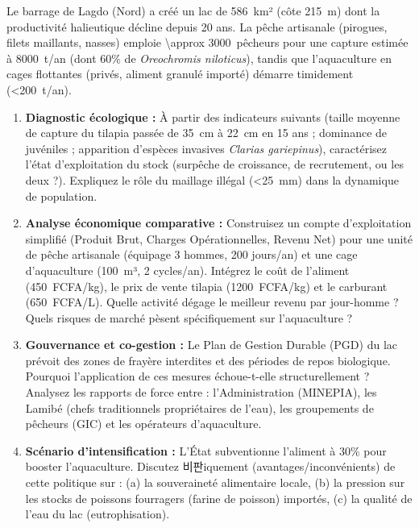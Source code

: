 \documentclass[11pt]{article}
\begin{document}
\begin{exercice}
Le barrage de Lagdo (Nord) a créé un lac de \SI{586}{km²} (côte \SI{215}{m}) dont la productivité halieutique décline depuis 20 ans. La pêche artisanale (pirogues, filets maillants, nasses) emploie \SI{\approx 3000}{pêcheurs} pour une capture estimée à \SI{8000}{t/an} (dont 60\% de \textit{Oreochromis niloticus}), tandis que l'aquaculture en cages flottantes (privés, aliment granulé importé) démarre timidement (\SI{<200}{t/an}).
\begin{enumerate}
    \item \textbf{Diagnostic écologique :} À partir des indicateurs suivants (taille moyenne de capture du tilapia passée de \SI{35}{cm} à \SI{22}{cm} en 15 ans ; dominance de juvéniles ; apparition d'espèces invasives \textit{Clarias gariepinus}), caractérisez l'état d'exploitation du stock (surpêche de croissance, de recrutement, ou les deux ?). Expliquez le rôle du maillage illégal (\SI{<25}{mm}) dans la dynamique de population.
    \item \textbf{Analyse économique comparative :} Construisez un compte d'exploitation simplifié (Produit Brut, Charges Opérationnelles, Revenu Net) pour une unité de pêche artisanale (équipage 3 hommes, 200 jours/an) et une cage d'aquaculture (\SI{100}{m³}, 2 cycles/an). Intégrez le coût de l'aliment (\SI{450}{FCFA/kg}), le prix de vente tilapia (\SI{1200}{FCFA/kg}) et le carburant (\SI{650}{FCFA/L}). Quelle activité dégage le meilleur revenu par jour-homme ? Quels risques de marché pèsent spécifiquement sur l'aquaculture ?
    \item \textbf{Gouvernance et co-gestion :} Le Plan de Gestion Durable (PGD) du lac prévoit des zones de frayère interdites et des périodes de repos biologique. Pourquoi l'application de ces mesures échoue-t-elle structurellement ? Analysez les rapports de force entre : l'Administration (MINEPIA), les Lamibé (chefs traditionnels propriétaires de l'eau), les groupements de pêcheurs (GIC) et les opérateurs d'aquaculture.
    \item \textbf{Scénario d'intensification :} L'État subventionne l'aliment à 30\% pour booster l'aquaculture. Discutez 비판iquement (avantages/inconvénients) de cette politique sur : (a) la souveraineté alimentaire locale, (b) la pression sur les stocks de poissons fourragers (farine de poisson) importés, (c) la qualité de l'eau du lac (eutrophisation).
\end{enumerate}
\end{exercice}
\end{document}

